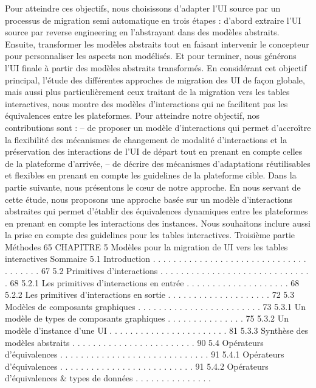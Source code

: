 \documentclass{article}
\begin{document}
Pour atteindre ces objectifs, nous choisissons d’adapter l’UI source par un processus de migration
semi automatique en trois étapes : d’abord extraire l’UI source par reverse engineering en l’abstrayant
dans des modèles abstraits. Ensuite, transformer les modèles abstraits tout en faisant intervenir le
concepteur pour personnaliser les aspects non modélisés. Et pour terminer, nous générons l’UI ﬁnale
à partir des modèles abstraits transformés.
En considérant cet objectif principal, l’étude des différentes approches de migration des UI de
façon globale, mais aussi plus particulièrement ceux traitant de la migration vers les tables interactives,
nous montre des modèles d’interactions qui ne facilitent pas les équivalences entre les plateformes.
Pour atteindre notre objectif, nos contributions sont :
– de proposer un modèle d’interactions qui permet d’accroître la ﬂexibilité des mécanismes de
changement de modalité d’interactions et la préservation des interactions de l’UI de départ tout
en prenant en compte celles de la plateforme d’arrivée,
– de décrire des mécanismes d’adaptations réutilisables et ﬂexibles en prenant en compte les
guidelines de la plateforme cible.
Dans la partie suivante, nous présentons le cœur de notre approche. En nous servant de cette étude,
nous proposons une approche basée sur un modèle d’interactions abstraites qui permet d’établir des
équivalences dynamiques entre les plateformes en prenant en compte les interactions des instances.
Nous souhaitons inclure aussi la prise en compte des guidelines pour les tables interactives.
Troisième partie
Méthodes
65
CHAPITRE 5
Modèles pour la migration de UI vers les
tables interactives
Sommaire
5.1
Introduction . . . . . . . . . . . . . . . . . . . . . . . . . . . . . . . . . . . . .
67
5.2
Primitives d’interactions
. . . . . . . . . . . . . . . . . . . . . . . . . . . . . .
68
5.2.1
Les primitives d’interactions en entrée . . . . . . . . . . . . . . . . . . . .
68
5.2.2
Les primitives d’interactions en sortie . . . . . . . . . . . . . . . . . . . .
72
5.3
Modèles de composants graphiques
. . . . . . . . . . . . . . . . . . . . . . . .
73
5.3.1
Un modèle de types de composants graphiques . . . . . . . . . . . . . . .
75
5.3.2
Un modèle d’instance d’une UI
. . . . . . . . . . . . . . . . . . . . . . .
81
5.3.3
Synthèse des modèles abstraits . . . . . . . . . . . . . . . . . . . . . . . .
90
5.4
Opérateurs d’équivalences
. . . . . . . . . . . . . . . . . . . . . . . . . . . . .
91
5.4.1
Opérateurs d’équivalences . . . . . . . . . . . . . . . . . . . . . . . . . .
91
5.4.2
Opérateurs d’équivalences & types de données . . . . . . . . . . . . . . .
\end{document}
